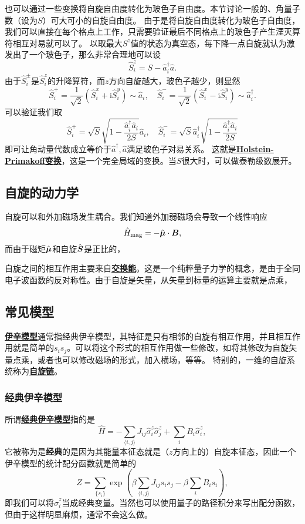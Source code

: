 \documentclass[hyperref, UTF8, a4paper]{ctexart}
\newcommand*{\ii}{\mathrm{i}}
\newcommand*{\pair}[1]{\langle #1 \rangle}
\renewcommand{\emph}[1]{\textbf{#1}}
\newcommand*{\concept}[1]{\underline{\textbf{#1}}}
\begin{document}
也可以通过一些变换将自旋自由度转化为玻色子自由度。本节讨论一般的、角量子数（设为$S$）可大可小的自旋自由度。
由于是将自旋自由度转化为玻色子自由度，我们可以直接在每个格点上工作，只需要验证最后不同格点上的玻色子产生湮灭算符相互对易就可以了。
以取最大$S^z$值的状态为真空态，每下降一点自旋就认为激发出了一个玻色子，那么非常合理地可以设
\[
    \hat{S}_i^z = S - \hat{a}^\dagger_i \hat{a}.
\]
由于$\hat{S}_i^\pm$是$\hat{S}^z_i$的升降算符，而$z$方向自旋越大，玻色子越少，则显然
\[
    \hat{S}_i^+ = \frac{1}{\sqrt{2}} (\hat{S}^x_i + \ii \hat{S}^y_i) \sim \hat{a}_i, \quad \hat{S}_i^- = \frac{1}{\sqrt{2}} (\hat{S}^x_i - \ii \hat{S}^y_i) \sim \hat{a}_i^\dagger.
\]
可以验证我们取
\begin{equation}
    \hat{S}^+_i = \sqrt{S} \sqrt{1 - \frac{\hat{a}_i^\dagger \hat{a}_i}{2S}} \hat{a}_i, \quad \hat{S}^-_i = \sqrt{S} \hat{a}_i^\dagger \sqrt{1 - \frac{\hat{a}_i^\dagger \hat{a}_i}{2S}}
\end{equation}
即可让角动量代数成立等价于$\hat{a}^\dagger, \hat{a}$满足玻色子对易关系。
这就是\concept{Holstein-Primakoff变换}，这是一个完全局域的变换。当$S$很大时，可以做泰勒级数展开。

\subsection{自旋的动力学}

自旋可以和外加磁场发生耦合。我们知道外加弱磁场会导致一个线性响应
\[
    \hat{H}_\text{mag} = - \hat{\vb*{\mu}} \cdot \vb*{B},
\]
而由于磁矩$\hat{\vb*{\mu}}$和自旋$\hat{\vb*{S}}$是正比的，

自旋之间的相互作用主要来自\concept{交换能}。这是一个纯粹量子力学的概念，是由于全同电子波函数的反对称性。由于自旋是矢量，从矢量到标量的运算主要就是点乘，

\subsection{常见模型}

\concept{伊辛模型}通常指经典伊辛模型，其特征是只有相邻的自旋有相互作用，并且相互作用就是简单的$s_i s_j$。可以将这个形式的相互作用做一些修改，如将其修改为自旋矢量点乘，或者也可以修改磁场的形式，加入横场，等等。
特别的，一维的自旋系统称为\concept{自旋链}。

\subsubsection{经典伊辛模型}

所谓\concept{经典伊辛模型}指的是
\begin{equation}
    \hat{H} = - \sum_{\pair{i, j}} J_{ij} \hat{\sigma}_i^z \hat{\sigma}_j^z + \sum_{i} B_i \hat{\sigma}_i^z,
\end{equation}
它被称为是\emph{经典}的是因为其能量本征态就是（$z$方向上的）自旋本征态，因此一个伊辛模型的统计配分函数就是简单的
\begin{equation}
    Z = \sum_{\{s_i\}} \exp(\beta \sum_{\pair{i, j}} J_{ij} s_i s_j - \beta \sum_i B_i s_i),
\end{equation}
即我们可以将$\hat{\sigma}_i^z$当成经典变量。当然也可以使用量子的路径积分来写出配分函数，但由于这样明显麻烦，通常不会这么做。
\end{document}
